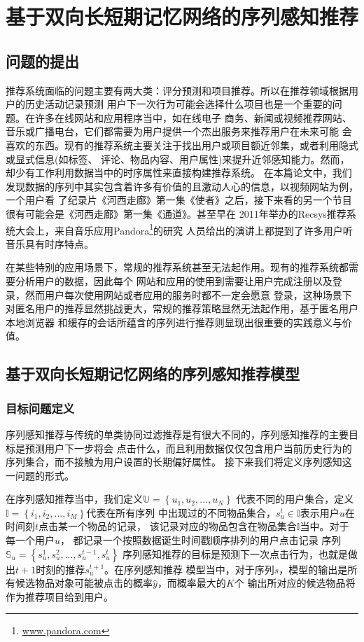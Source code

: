 ﻿%
\chapter{基于双向长短期记忆网络的序列感知推荐}

\section{问题的提出}
推荐系统面临的问题主要有两大类：评分预测和项目推荐。所以在推荐领域根据用户的历史活动记录预测%
用户下一次行为可能会选择什么项目也是一个重要的问题。在许多在线网站和应用程序当中，如在线电子%
商务、新闻或视频推荐网站、音乐或广播电台，它们都需要为用户提供一个杰出服务来推荐用户在未来可能%
会喜欢的东西。现有的推荐系统主要关注于找出用户或项目额近邻集，或者利用隐式或显式信息(如标签、%
评论、物品内容、用户属性)来提升近邻感知能力。然而，却少有工作利用数据当中的时序属性来直接构建推荐系统。%
在本篇论文中，我们发现数据的序列中其实包含着许多有价值的且激动人心的信息，以视频网站为例，一个用户看%
了纪录片《河西走廊》第一集《使者》之后，接下来看的另一个节目很有可能会是《河西走廊》第一集《通道》。甚至早在%
2011年举办的Recsys推荐系统大会上，来自音乐应用Pandora\footnote{\url{www.pandora.com}}的研究%
人员给出的演讲上都提到了许多用户听音乐具有时序特点。%

在某些特别的应用场景下，常规的推荐系统甚至无法起作用。现有的推荐系统都需要分析用户的数据，因此每个%
网站和应用的使用到需要让用户完成注册以及登录，然而用户每次使用网站或者应用的服务时都不一定会愿意%
登录，这种场景下对匿名用户的推荐显然挑战更大，常规的推荐策略显然无法起作用，基于匿名用户本地浏览器%
和缓存的会话所蕴含的序列进行推荐则显现出很重要的实践意义与价值。


%
%


\section{基于双向长短期记忆网络的序列感知推荐模型}
\subsection{目标问题定义}

序列感知推荐与传统的单类协同过滤推荐是有很大不同的，序列感知推荐的主要目标是预测用户下一步将会%
点击什么，而且利用数据仅仅包含用户当前历史行为的序列集合，而不接触为用户设置的长期偏好属性。%
接下来我们将定义序列感知这一问题的形式。%

在序列感知推荐当中，我们定义$\mathbb{U}= \left \{ u_{1},u_{2},...,u_{N} \right \}\label{eq}$%
代表不同的用户集合，定义$\mathbb{I}= \left \{ i_{1},i_{2},...,i_{M} \right \}$代表在所有序列%
中出现过的不同物品集合，$s_{u}^{t}\in \mathbb{I}$表示用户$u$在时间刻$t$点击某一个物品的记录，%
该记录对应的物品包含在物品集合$\mathbb{I}$当中。对于每一个用户$u$，%
都记录一个按照数据诞生时间戳顺序排列的用户点击记录%
序列$\mathbb{S}_{u}=\left \{ s_{u}^{1},s_{u}^{2},...,s_{u}^{t-1},s_{u}^{t} \right \}$%
序列感知推荐的目标是预测下一次点击行为，也就是做出$t+1$时刻的推荐$s_{u}^{t+1}$。在序列感知推荐%
模型当中，对于序列$s$，模型的输出是所有候选物品对象可能被点击的概率$\hat{y}$，而概率最大的$K$个%
输出所对应的候选物品将作为推荐项目给到用户。%
%
%
%
%

